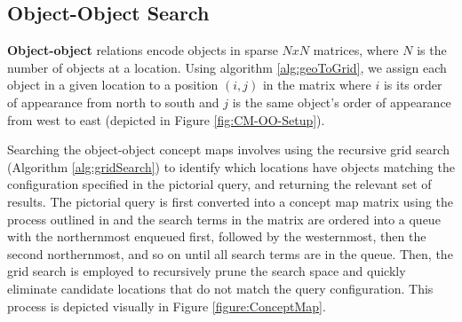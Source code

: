 \subsection{Object-Object Search}
\textbf{Object-object} relations encode objects in sparse $NxN$ matrices, where $N$ is the number of objects at a location. 
Using algorithm \ref{alg:geoToGrid}, we assign each object in a given location to a position $(i,j)$ in the matrix where $i$ is its order of appearance from north to south and $j$ is the same object's order of appearance from west to east (depicted in Figure \ref{fig:CM-OO-Setup}). 

Searching the object-object concept maps involves using the recursive grid search (Algorithm \ref{alg:gridSearch}) to identify which locations have objects matching the configuration specified in the pictorial query, and returning the relevant set of results. 
The pictorial query is first converted into a concept map matrix using the process outlined in  and the search terms in the matrix are ordered into a queue with the northernmost enqueued first, followed by the westernmost, then the second northernmost, and so on until all search terms are in the queue.
Then, the grid search is employed to recursively prune the search space and quickly eliminate candidate locations that do not match the query configuration.
This process is depicted visually in Figure \ref{figure:ConceptMap}.




